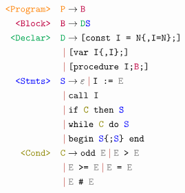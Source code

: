 \documentclass[a4paper]{article}
\begin{document}
\[
  \begin{aligned}
    \texttt{\color{orange}<Program>} \quad &\texttt{\color{orange}P\color{black}} \to
    \texttt{\color{purple}B} \\
    \texttt{\color{purple}<Block>} \quad &\texttt{\color{purple}B\color{black}} \to
    \texttt{\color{Green}D\color{blue}S} \\
    \texttt{\color{Green}<Declar>} \quad & \texttt{\color{Green}D\color{black}} \to
    \texttt{[const I = N\{,I=N\};]} \\
                   & \color{BrickRed}\color{BrickRed}\mid\color{black}\color{black} \texttt{[var I\{,I\};]} \\
                   & \color{BrickRed}\color{BrickRed}\mid\color{black}\color{black} \texttt{[procedure I;\color{purple}B\color{black};]} \\
    \texttt{\color{blue}<Stmts>} \quad & \texttt{\color{blue}S\color{black}} \to
    \varepsilon 
    \color{BrickRed}\color{BrickRed}\mid\color{black}\color{black} \texttt{I := \color{gray}E} \\
                   & \color{BrickRed}\color{BrickRed}\mid\color{black}\color{black} \texttt{call I} \\
                   & \color{BrickRed}\color{BrickRed}\mid\color{black}\color{black} \texttt{if \color{olive}C\color{black}\ then \color{blue}S\color{black}} \\
                   & \color{BrickRed}\color{BrickRed}\mid\color{black}\color{black} \texttt{while \color{olive}C\color{black}\ do \color{blue}S\color{black}} \\
                   & \color{BrickRed}\color{BrickRed}\mid\color{black}\color{black} \texttt{begin \color{blue}S\color{black}\{;\color{blue}S\color{black}\} end} \\
    \texttt{\color{olive}<Cond>} \quad & \texttt{\color{olive}C\color{black}} \to
    \texttt{odd \color{gray}E\color{black}} 
                    \color{BrickRed}\color{BrickRed}\mid\color{black}\color{black} \texttt{\color{gray}E\color{black}\ > \color{gray}E\color{black}} \\
                   & \color{BrickRed}\color{BrickRed}\mid\color{black}\color{black} \texttt{\color{gray}E\color{black}\ >= \color{gray}E\color{black}} 
                    \color{BrickRed}\color{BrickRed}\mid\color{black}\color{black} \texttt{\color{gray}E\color{black}\ = \color{gray}E\color{black}} \\
                   & \color{BrickRed}\color{BrickRed}\mid\color{black}\color{black} \texttt{\color{gray}E\color{black}\ \# \color{gray}E\color{black}} 

\end{aligned}\]
\end{document}
